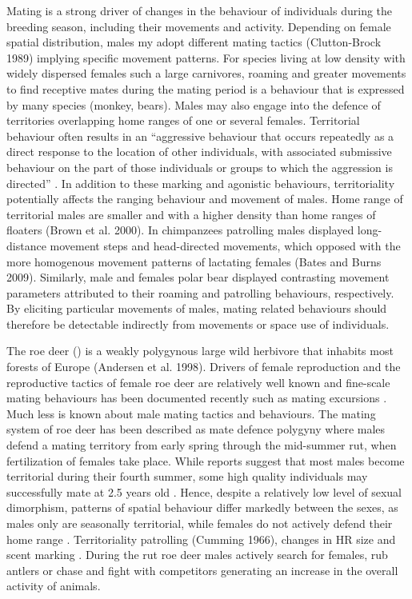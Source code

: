 \documentclass[a4paper,11pt]{article}
\newcommand{\species}[1]{(\xmakefirstuc{\emph{#1}})}
\begin{document}
Mating is a strong driver of changes in the behaviour of individuals
during the breeding season, including their movements and
activity. Depending on female spatial distribution, males my adopt
different mating tactics (Clutton-Brock 1989) implying specific
movement patterns. For species living at low density with widely
dispersed females such a large carnivores, roaming and greater
movements to find receptive mates during the mating period is a
behaviour that is expressed by many species (monkey, bears). Males may
also engage into the defence of territories overlapping home ranges of
one or several females. Territorial behaviour often results in an
“aggressive behaviour that occurs repeatedly as a direct response to
the location of other individuals, with associated submissive
behaviour on the part of those individuals or groups to which the
aggression is directed” \citep{pyke_territoriality_1996}. In addition
to these marking and agonistic behaviours, territoriality potentially
affects the ranging behaviour and movement of males. Home range of
territorial males are smaller and with a higher density than home
ranges of floaters (Brown et al. 2000). In chimpanzees patrolling
males displayed long-distance movement steps and head-directed
movements, which opposed with the more homogenous movement patterns of
lactating females (Bates and Burns 2009). Similarly, male and females
polar bear displayed contrasting movement parameters attributed to
their roaming and patrolling behaviours, respectively. By eliciting
particular movements of males, mating related behaviours should
therefore be detectable indirectly from movements or space use of
individuals.

The roe deer \species{Capreolus capreolus} is a weakly polygynous
large wild herbivore that inhabits most forests of Europe (Andersen et
al. 1998). Drivers of female reproduction and the reproductive tactics
of female roe deer are relatively well known
\citep{andersen_social_1998} and fine-scale mating behaviours has been
documented recently such as mating excursions
\citep{debeffe_one_2014}. Much less is known about male mating tactics
and behaviours. The mating system of roe deer has been described as
mate defence polygyny \citep{vanpe_mating_2008} where males defend a
mating territory from early spring through the mid-summer rut, when
fertilization of females take place. While reports suggest that most
males become territorial during their fourth summer, some high quality
individuals may successfully mate at 2.5 years old
\citep{vanpe_age-specific_2009}. Hence, despite a relatively low level
of sexual dimorphism, patterns of spatial behaviour differ markedly
between the sexes, as males only are seasonally territorial, while
females do not actively defend their home range \citep[but
see][]{maublanc_ranging_2012}. Territoriality patrolling (Cumming
1966), changes in HR size and scent marking
\citep{gosling_reassessment_1982}. During the rut roe deer males
actively search for females, rub antlers or chase and fight with
competitors generating an increase in the overall activity of animals.
\end{document}
